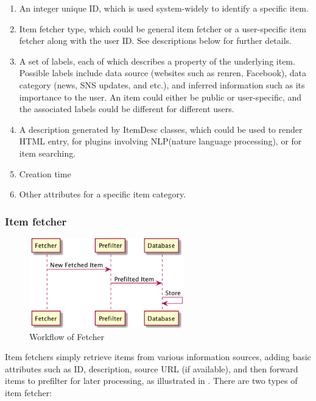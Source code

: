 \begin{enumerate}
\def\labelenumi{\arabic{enumi}.}
\itemsep1pt\parskip0pt
\item
  An integer unique ID, which is used system-widely to identify a
  specific item.
\item
  Item fetcher type, which could be general item fetcher or a
  user-specific item fetcher along with the user ID. See descriptions
  below for further details.
\item
  A set of labels, each of which describes a property of the underlying
  item. Possible labels include data source (websites such as renren,
  Facebook), data category (news, SNS updates, and etc.), and inferred
  information such as its importance to the user. An item could either
  be public or user-specific, and the associated labels could be
  different for different users.
\item
  A description generated by ItemDesc classes, which could be used to render
  HTML entry, for plugins involving NLP(nature language processing), or for item
  searching.
\item
  Creation time
\item
  Other attributes for a specific item category.
\end{enumerate}

\subsubsection{Item fetcher}

\begin{figure}[H]
  \centering
  \includegraphics[width=0.6\textwidth]{img/fetch.png}
  \caption{Workflow of Fetcher \label{fig:fetcher}}
\end{figure}


Item fetchers simply retrieve items from various information sources,
adding basic attributes such as ID, description, source URL (if
available), and then forward items to prefilter for later processing, as illustrated in .
There are two types of item fetcher:

